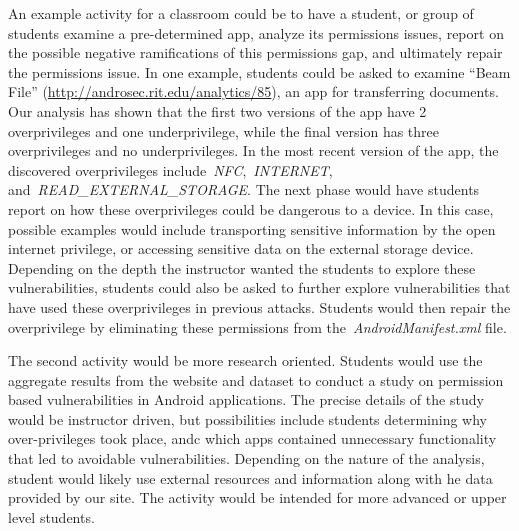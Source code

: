 \documentclass[journal,transmag]{IEEEtran}
\begin{document}



An example activity for a classroom could be to have a student, or group of students examine a pre-determined app, analyze its permissions issues, report on the possible negative ramifications of this permissions gap, and ultimately repair the permissions issue. In one example, students could be asked to examine ``Beam File'' (\url{http://androsec.rit.edu/analytics/85}), an app for transferring documents. Our analysis has shown that the first two versions of the app have 2 overprivileges and one underprivilege, while the final version has three overprivileges and no underprivileges. In the most recent version of the app, the discovered overprivileges include~\emph{NFC},~\emph{INTERNET}, and~\emph{READ\_EXTERNAL\_STORAGE}. The next phase would have students report on how these overprivileges could be dangerous to a device. In this case, possible examples would include transporting sensitive information by the open internet privilege, or accessing sensitive data on the external storage device. Depending on the depth the instructor wanted the students to explore these vulnerabilities, students could also be asked to further explore vulnerabilities that have used these overprivileges in previous attacks. Students would then repair the overprivilege by eliminating these permissions from the~\emph{AndroidManifest.xml} file.


The second activity would be more research oriented. Students would use the aggregate results from the website and dataset to conduct a study on permission based vulnerabilities in Android applications. The precise details of the study would be instructor driven, but possibilities include students determining why over-privileges took place, andc which apps contained unnecessary functionality that led to avoidable vulnerabilities. Depending on the nature of the analysis, student would likely use external resources and information along with he data provided by our site. The activity would be intended for more advanced or upper level students.






\end{document}
